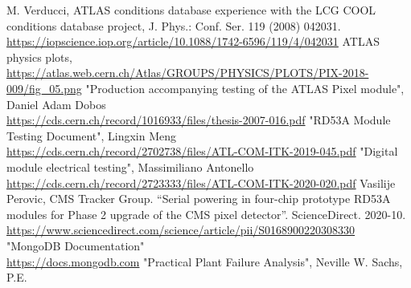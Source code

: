 \begin{thebibliography}{24}
M. Verducci, ATLAS conditions database experience with the LCG COOL conditions database project, J. Phys.: Conf. Ser. 119 (2008) 042031.
\url{https://iopscience.iop.org/article/10.1088/1742-6596/119/4/042031}
ATLAS physics plots, \url{https://atlas.web.cern.ch/Atlas/GROUPS/PHYSICS/PLOTS/PIX-2018-009/fig_05.png}
"Production accompanying testing of the ATLAS Pixel module", Daniel Adam Dobos\\
\url{https://cds.cern.ch/record/1016933/files/thesis-2007-016.pdf}
"RD53A Module Testing Document", Lingxin Meng\\ \url{https://cds.cern.ch/record/2702738/files/ATL-COM-ITK-2019-045.pdf}
"Digital module electrical testing", Massimiliano Antonello\\ \url{https://cds.cern.ch/record/2723333/files/ATL-COM-ITK-2020-020.pdf}
Vasilije Perovic, CMS Tracker Group. “Serial powering in four-chip prototype RD53A modules for Phase 2 upgrade of the CMS pixel detector”. ScienceDirect. 2020-10.\\ \url{https://www.sciencedirect.com/science/article/pii/S0168900220308330}
"MongoDB Documentation" \\ \url{https://docs.mongodb.com}
"Practical Plant Failure Analysis", Neville W. Sachs, P.E.
\end{thebibliography}
